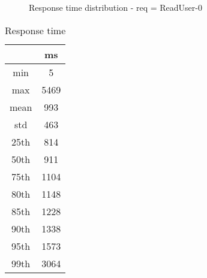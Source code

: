 \begin{minipage}{0.75\linewidth}
\begin{figure}[h]
\begin{adjustbox}{max width=1.0\linewidth, keepaspectratio}
  \end{adjustbox}
  \caption{Response time distribution - req = ReadUser-0}
\end{figure}
\end{minipage}\hfill\begin{minipage}{0.18\linewidth}
\begin{table}[h]
\begin{tabular}{|cc|}
\hline
\textbf{} & \textbf{ms}\\ \hline
 \Xhline{0.005\arrayrulewidth}
min & 5\\
 \Xhline{0.005\arrayrulewidth}
max & 5469\\
 \Xhline{0.005\arrayrulewidth}
mean & 993\\
 \Xhline{0.005\arrayrulewidth}
std & 463\\
\hline
\hline
 \Xhline{0.005\arrayrulewidth}
25th & 814\\
 \Xhline{0.005\arrayrulewidth}
50th & 911\\
 \Xhline{0.005\arrayrulewidth}
75th & 1104\\
 \Xhline{0.005\arrayrulewidth}
80th & 1148\\
 \Xhline{0.005\arrayrulewidth}
85th & 1228\\
 \Xhline{0.005\arrayrulewidth}
90th & 1338\\
 \Xhline{0.005\arrayrulewidth}
95th & 1573\\
 \Xhline{0.005\arrayrulewidth}
99th & 3064\\
\hline
\end{tabular}
\caption{Response time}
\end{table}
\end{minipage}\hfill